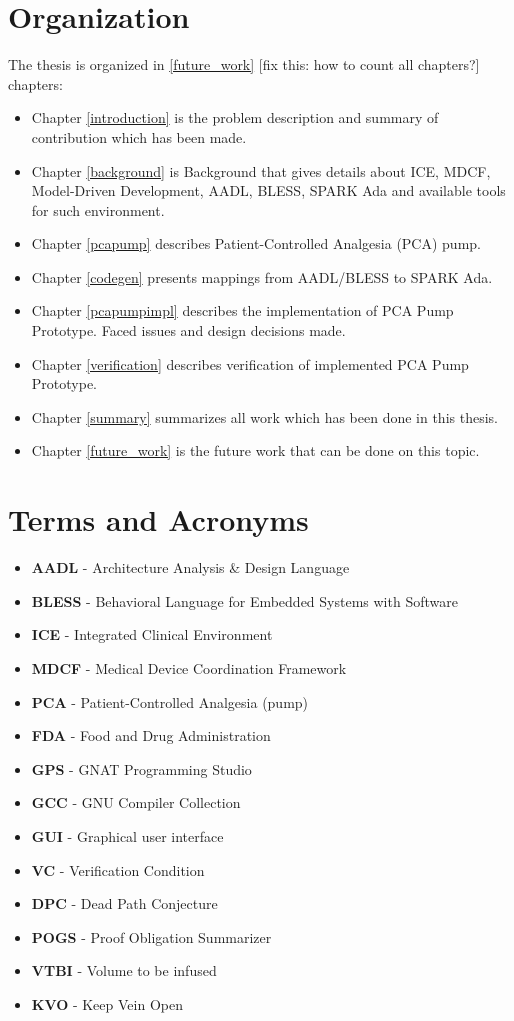 \section{Organization}
\label{introduction:organization}
The thesis is organized in \ref{future_work} [fix this: how to count all chapters?] chapters:
\begin{itemize}
	\item Chapter \ref{introduction} is the problem description and summary of contribution which has been made. 
	\item Chapter \ref{background} is Background that gives details about ICE, MDCF, Model-Driven Development, AADL, BLESS, SPARK Ada and available tools for such environment. 
	\item Chapter \ref{pcapump} describes Patient-Controlled Analgesia (PCA) pump.
	\item Chapter \ref{codegen} presents mappings from AADL/BLESS to SPARK Ada. 
	\item Chapter \ref{pcapumpimpl} describes the implementation of PCA Pump Prototype. Faced issues and design decisions made.
	\item Chapter \ref{verification} describes verification of implemented PCA Pump Prototype. 
	\item Chapter \ref{summary} summarizes all work which has been done in this thesis. 
	\item Chapter \ref{future_work} is the future work that can be done on this topic.
\end{itemize}


\section{Terms and Acronyms}
\label{introduction:terms}

\begin{itemize}
	\item \textbf{AADL} - Architecture Analysis \& Design Language
	\item \textbf{BLESS} - Behavioral Language for Embedded Systems with Software
	\item \textbf{ICE} - Integrated Clinical Environment
	\item \textbf{MDCF} - Medical Device Coordination Framework
	\item \textbf{PCA} - Patient-Controlled Analgesia (pump)
	\item \textbf{FDA} - Food and Drug Administration
	\item \textbf{GPS} - GNAT Programming Studio
	\item \textbf{GCC} - GNU Compiler Collection
	\item \textbf{GUI} - Graphical user interface
	\item \textbf{VC} - Verification Condition
	\item \textbf{DPC} - Dead Path Conjecture
	\item \textbf{POGS} - Proof Obligation Summarizer
	\item \textbf{VTBI} - Volume to be infused
	\item \textbf{KVO} - Keep Vein Open
\end{itemize}